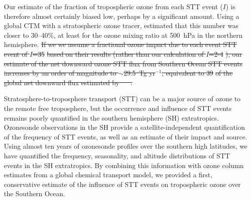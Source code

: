\documentclass[acp, manuscript]{copernicus} %
\providecommand{\DIFdel}[1]{{\protect\color{red}\sout{#1}}}                      %
\providecommand{\DIFdelbegin}{} %
\providecommand{\DIFdelend}{} %
\begin{document}
\DIFdelend %
  Our estimate of the fraction of tropospheric ozone from each STT event ($I$) is therefore almost certainly biased low, perhaps by a significant amount. 
  Using a global CTM with a stratospheric ozone tracer, \citet{Terao2008} estimated that this number was closer to 30--40\%, at least for the ozone mixing ratio at 500~hPa in the northern hemisphere.
  \DIFdelbegin \DIFdel{If we we assume a fractional ozone impact due to each event STT event of $I$=35}%
\DIFdel{based on their results (rather than our calculation of $I$=2-4}%
\DIFdel{), our estimate of the net downward ozone STT flux from Southern Ocean STT events increases by an order of magnitude to $\sim$29.5~Tg yr$^{-1}$, equivalent to 39}%
\DIFdel{of the global net downward flux estimated by \mbox{%
\citet{Sprenger2003}
}%
.
  }\DIFdelend 



\conclusions  %
%

Stratosphere-to-troposphere transport (STT) can be a major source of ozone to the remote free troposphere, but the occurrence and influence of STT events remains poorly quantified in the southern hemisphere (SH) extratropics.
Ozonesonde observations in the SH provide a satellite-independent quantification of the frequency of STT events, as well as an estimate of their impact and source.
Using almost ten years of ozonesonde profiles over the southern high latitudes, we have quantified the frequency, seasonality, and altitude distributions of STT events in the SH extratropics. 
By combining this information with ozone column estimates from a global chemical transport model, we provided a first, conservative estimate of the influence of STT events on tropospheric ozone over the Southern Ocean.
\end{document}
